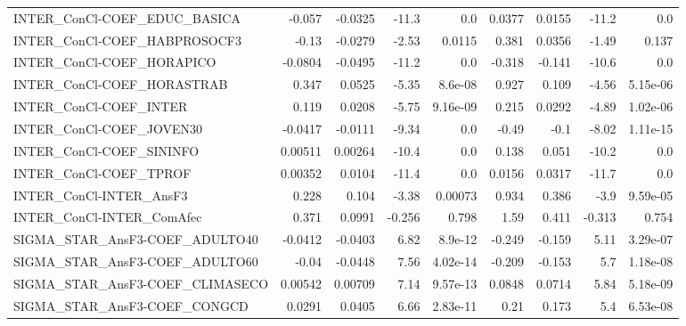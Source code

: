 \begin{tabular}{lrrrrrrrr}
INTER\_ConCl-COEF\_EDUC\_BASICA        &      -0.057 &      -0.0325 &   -11.3 &      0.0 &     0.0377 &      0.0155 &        -11.2 &           0.0 \\
INTER\_ConCl-COEF\_HABPROSOCF3        &       -0.13 &      -0.0279 &   -2.53 &   0.0115 &      0.381 &      0.0356 &        -1.49 &         0.137 \\
INTER\_ConCl-COEF\_HORAPICO           &     -0.0804 &      -0.0495 &   -11.2 &      0.0 &     -0.318 &      -0.141 &        -10.6 &           0.0 \\
INTER\_ConCl-COEF\_HORASTRAB          &       0.347 &       0.0525 &   -5.35 &  8.6e-08 &      0.927 &       0.109 &        -4.56 &      5.15e-06 \\
INTER\_ConCl-COEF\_INTER              &       0.119 &       0.0208 &   -5.75 & 9.16e-09 &      0.215 &      0.0292 &        -4.89 &      1.02e-06 \\
INTER\_ConCl-COEF\_JOVEN30            &     -0.0417 &      -0.0111 &   -9.34 &      0.0 &      -0.49 &        -0.1 &        -8.02 &      1.11e-15 \\
INTER\_ConCl-COEF\_SININFO            &     0.00511 &      0.00264 &   -10.4 &      0.0 &      0.138 &       0.051 &        -10.2 &           0.0 \\
INTER\_ConCl-COEF\_TPROF              &     0.00352 &       0.0104 &   -11.4 &      0.0 &     0.0156 &      0.0317 &        -11.7 &           0.0 \\
INTER\_ConCl-INTER\_AnsF3             &       0.228 &        0.104 &   -3.38 &  0.00073 &      0.934 &       0.386 &         -3.9 &      9.59e-05 \\
INTER\_ConCl-INTER\_ComAfec           &       0.371 &       0.0991 &  -0.256 &    0.798 &       1.59 &       0.411 &       -0.313 &         0.754 \\
SIGMA\_STAR\_AnsF3-COEF\_ADULTO40      &     -0.0412 &      -0.0403 &    6.82 &  8.9e-12 &     -0.249 &      -0.159 &         5.11 &      3.29e-07 \\
SIGMA\_STAR\_AnsF3-COEF\_ADULTO60      &       -0.04 &      -0.0448 &    7.56 & 4.02e-14 &     -0.209 &      -0.153 &          5.7 &      1.18e-08 \\
SIGMA\_STAR\_AnsF3-COEF\_CLIMASECO     &     0.00542 &      0.00709 &    7.14 & 9.57e-13 &     0.0848 &      0.0714 &         5.84 &      5.18e-09 \\
SIGMA\_STAR\_AnsF3-COEF\_CONGCD        &      0.0291 &       0.0405 &    6.66 & 2.83e-11 &       0.21 &       0.173 &          5.4 &      6.53e-08 \\

\end{tabular}

